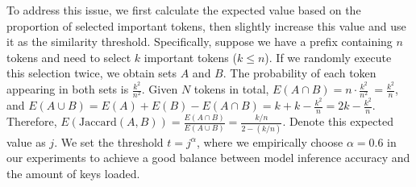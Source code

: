 To address this issue, we first calculate the expected value based on the proportion of selected important tokens, then slightly increase this value and use it as the similarity threshold.
Specifically, suppose we have a prefix containing \(n\) tokens and need to select \(k\) important tokens (\(k \leq n\)). If we randomly execute this selection twice, we obtain sets \(A\) and \(B\). The probability of each token appearing in both sets is \(\frac{k^2}{n^2}\). Given \(N\) tokens in total, \(E(A \cap B) = n \cdot \frac{k^2}{n^2}\ = \frac{k^2}{n}\), and \(E(A \cup B) = E(A) + E(B) - E(A \cap B) = k + k - \frac{k^2}{n} = 2k - \frac{k^2}{n}\). Therefore, \(E(\text{Jaccard}(A, B)) = \frac{E(A \cap B)}{E(A \cup B)} = \frac{k/n}{2 - (k/n)}\). Denote this expected value as \(j\). We set the threshold \(t = j^\alpha\), where we empirically choose \(\alpha = 0.6\) in our experiments to achieve a good balance between model inference accuracy and the amount of keys loaded. 





